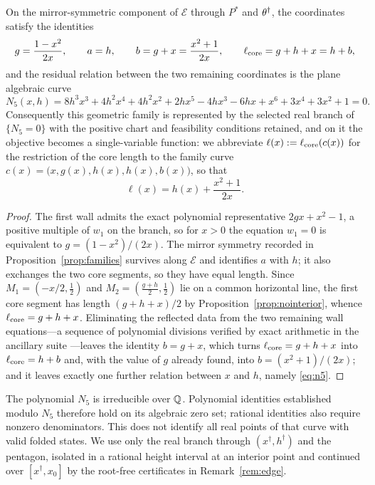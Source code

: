 \begin{proposition}\label{prop:familyreduction}
On the mirror-symmetric component of $\mathcal E$ through $P^*$ and $\theta^\dagger$, the coordinates satisfy the identities
\begin{equation}\label{eq:familyids}
  g=\frac{1-x^2}{2x},\qquad a=h,\qquad b=g+x=\frac{x^2+1}{2x},\qquad \ell_{\mathrm{core}}=g+h+x=h+b,
\end{equation}
and the residual relation between the two remaining coordinates is the plane algebraic curve
\begin{equation}\label{eq:n5}
  N_5(x,h)=8h^3x^3+4h^2x^4+4h^2x^2+2hx^5-4hx^3-6hx+x^6+3x^4+3x^2+1=0 .
\end{equation}
Consequently this geometric family is represented by the selected real branch of $\{N_5=0\}$ with the positive chart and feasibility conditions retained, and on it the objective becomes a single-variable function: we abbreviate $\ell(x):=\ell_{\mathrm{core}}(c(x))$ for the restriction of the core length to the family curve $c(x)=\bigl(x,g(x),h(x),h(x),b(x)\bigr)$, so that
\begin{equation}\label{eq:ellofx}
  \ell(x)=h(x)+\frac{x^2+1}{2x} .
\end{equation}
\end{proposition}

\begin{proof}
The first wall admits the exact polynomial representative $2gx+x^2-1$, a positive multiple of $w_1$ on the branch, so for $x>0$ the equation $w_1=0$ is equivalent to $g=(1-x^2)/(2x)$. The mirror symmetry recorded in Proposition~\ref{prop:families} survives along $\mathcal E$ and identifies $a$ with $h$; it also exchanges the two core segments, so they have equal length. Since $M_1=(-x/2,\frac12)$ and $M_2=(\frac{g+h}2,\frac12)$ lie on a common horizontal line, the first core segment has length $(g+h+x)/2$ by Proposition~\ref{prop:nointerior}, whence $\ell_{\mathrm{core}}=g+h+x$. Eliminating the reflected data from the two remaining wall equations---a sequence of polynomial divisions verified by exact arithmetic in the ancillary suite \cite{anc}---leaves the identity $b=g+x$, which turns $\ell_{\mathrm{core}}=g+h+x$ into $\ell_{\mathrm{core}}=h+b$ and, with the value of $g$ already found, into $b=(x^2+1)/(2x)$; and it leaves exactly one further relation between $x$ and $h$, namely \eqref{eq:n5}.
\end{proof}

\begin{proposition}\label{prop:n5irred}
The polynomial $N_5$ is irreducible over $\mathbb{Q}$. Polynomial identities established modulo $N_5$ therefore hold on its algebraic zero set; rational identities also require nonzero denominators. This does not identify all real points of that curve with valid folded states. We use only the real branch through $(x^\dagger,h^\dagger)$ and the pentagon, isolated in a rational height interval at an interior point and continued over $[x^\dagger,x_0]$ by the root-free certificates in Remark~\ref{rem:edge}.
\end{proposition}


